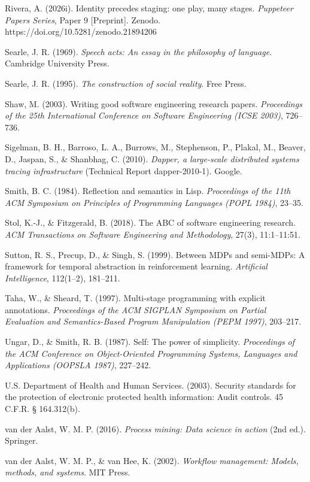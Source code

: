 \documentclass[
]{article}
\begin{document}
Rivera, A. (2026i). Identity precedes staging: one play, many stages.
\emph{Puppeteer Papers Series}, Paper 9 {[}Preprint{]}. Zenodo.
https://doi.org/10.5281/zenodo.21894206

Searle, J. R. (1969). \emph{Speech acts: An essay in the philosophy of
language}. Cambridge University Press.

Searle, J. R. (1995). \emph{The construction of social reality}. Free
Press.

Shaw, M. (2003). Writing good software engineering research papers.
\emph{Proceedings of the 25th International Conference on Software
Engineering (ICSE 2003)}, 726--736.

Sigelman, B. H., Barroso, L. A., Burrows, M., Stephenson, P., Plakal,
M., Beaver, D., Jaspan, S., \& Shanbhag, C. (2010). \emph{Dapper, a
large-scale distributed systems tracing infrastructure} (Technical
Report dapper-2010-1). Google.

Smith, B. C. (1984). Reflection and semantics in Lisp. \emph{Proceedings
of the 11th ACM Symposium on Principles of Programming Languages (POPL
1984)}, 23--35.

Stol, K.-J., \& Fitzgerald, B. (2018). The ABC of software engineering
research. \emph{ACM Transactions on Software Engineering and
Methodology}, 27(3), 11:1--11:51.

Sutton, R. S., Precup, D., \& Singh, S. (1999). Between MDPs and
semi-MDPs: A framework for temporal abstraction in reinforcement
learning. \emph{Artificial Intelligence}, 112(1--2), 181--211.

Taha, W., \& Sheard, T. (1997). Multi-stage programming with explicit
annotations. \emph{Proceedings of the ACM SIGPLAN Symposium on Partial
Evaluation and Semantics-Based Program Manipulation (PEPM 1997)},
203--217.

Ungar, D., \& Smith, R. B. (1987). Self: The power of simplicity.
\emph{Proceedings of the ACM Conference on Object-Oriented Programming
Systems, Languages and Applications (OOPSLA 1987)}, 227--242.

U.S. Department of Health and Human Services. (2003). Security standards
for the protection of electronic protected health information: Audit
controls. 45 C.F.R. § 164.312(b).

van der Aalst, W. M. P. (2016). \emph{Process mining: Data science in
action} (2nd ed.). Springer.

van der Aalst, W. M. P., \& van Hee, K. (2002). \emph{Workflow
management: Models, methods, and systems}. MIT Press.
\end{document}
